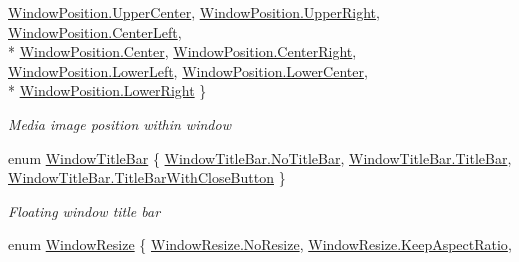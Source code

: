 \begin{DoxyCompactItemize}
\hyperlink{namespace_pdf_file_writer_a096e8344234e0e62db8e6ce21ef3c41dad04aa2ea3d1e9deb66236247893cc603}{Window\+Position.\+Upper\+Center}, 
\hyperlink{namespace_pdf_file_writer_a096e8344234e0e62db8e6ce21ef3c41da894d4b94cedce8501ff5165b6863ea3a}{Window\+Position.\+Upper\+Right}, 
\hyperlink{namespace_pdf_file_writer_a096e8344234e0e62db8e6ce21ef3c41da9f44821a7b58abb265709f49e54ef8ca}{Window\+Position.\+Center\+Left}, 
\\*
\hyperlink{namespace_pdf_file_writer_a096e8344234e0e62db8e6ce21ef3c41da4f1f6016fc9f3f2353c0cc7c67b292bd}{Window\+Position.\+Center}, 
\hyperlink{namespace_pdf_file_writer_a096e8344234e0e62db8e6ce21ef3c41daa538ef718186c9e0967239bb60043d1f}{Window\+Position.\+Center\+Right}, 
\hyperlink{namespace_pdf_file_writer_a096e8344234e0e62db8e6ce21ef3c41daa8594fd8be60c94e1a2607fa0fa50fae}{Window\+Position.\+Lower\+Left}, 
\hyperlink{namespace_pdf_file_writer_a096e8344234e0e62db8e6ce21ef3c41da4dc6391f310bea83cdf5d7675e0cc5f0}{Window\+Position.\+Lower\+Center}, 
\\*
\hyperlink{namespace_pdf_file_writer_a096e8344234e0e62db8e6ce21ef3c41da5ef0d4d135d5f2814b07feaf13fda653}{Window\+Position.\+Lower\+Right}
 \}\begin{DoxyCompactList}\small\item\em Media image position within window \end{DoxyCompactList}
\item 
enum \hyperlink{namespace_pdf_file_writer_a61733ec2bbd267bda46a3781cb5f0f09}{Window\+Title\+Bar} \{ \hyperlink{namespace_pdf_file_writer_a61733ec2bbd267bda46a3781cb5f0f09a41a128473817e7f779586b8a80f550ea}{Window\+Title\+Bar.\+No\+Title\+Bar}, 
\hyperlink{namespace_pdf_file_writer_a61733ec2bbd267bda46a3781cb5f0f09a8db484cb34af98d41a63c3f9f8350666}{Window\+Title\+Bar.\+Title\+Bar}, 
\hyperlink{namespace_pdf_file_writer_a61733ec2bbd267bda46a3781cb5f0f09a1a592329468d08ceb7df202b5b07be47}{Window\+Title\+Bar.\+Title\+Bar\+With\+Close\+Button}
 \}\begin{DoxyCompactList}\small\item\em Floating window title bar \end{DoxyCompactList}
\item 
enum \hyperlink{namespace_pdf_file_writer_ad205ccc8e28ac3421bff44c8f010ccf4}{Window\+Resize} \{ \hyperlink{namespace_pdf_file_writer_ad205ccc8e28ac3421bff44c8f010ccf4a137e49a657a5118d46b56f613fb52afe}{Window\+Resize.\+No\+Resize}, 
\hyperlink{namespace_pdf_file_writer_ad205ccc8e28ac3421bff44c8f010ccf4ad5918ff91d32f152571819a564c0bdf2}{Window\+Resize.\+Keep\+Aspect\+Ratio}, 

\end{DoxyCompactItemize}
